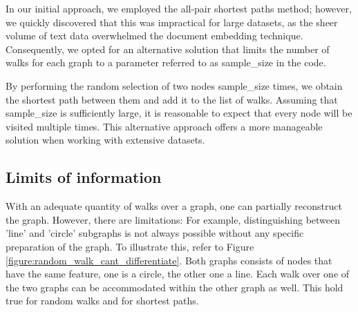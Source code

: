In our initial approach, we employed the all-pair shortest paths method; however, we quickly discovered that this was impractical for large datasets, as the sheer volume of text data overwhelmed the document embedding technique. Consequently, we opted for an alternative solution that limits the number of walks for each graph to a parameter referred to as sample\_size in the code.

By performing the random selection of two nodes sample\_size times, we obtain the shortest path between them and add it to the list of walks. Assuming that sample\_size is sufficiently large, it is reasonable to expect that every node will be visited multiple times. This alternative approach offers a more manageable solution when working with extensive datasets.

\subsection{Limits of information}
With an adequate quantity of walks over a graph, one can partially reconstruct the graph. However, there are limitations: For example, distinguishing between 'line' and 'circle' subgraphs is not always possible without any specific preparation of the graph. To illustrate this, refer to Figure \ref{figure:random_walk_cant_differentiate}. Both graphs consists of nodes that have the same feature, one is a circle, the other one a line. Each walk over one of the two graphs can be accommodated within the other graph as well. This hold true for random walks and for shortest paths.

